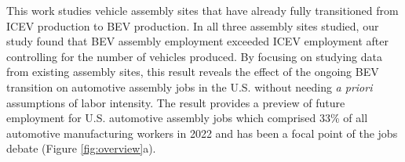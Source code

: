 \documentclass[sn-mathphys,Numbered]{sn-jnl}%
\begin{document}
This work studies vehicle assembly sites that have already fully transitioned from ICEV production to BEV production. In all three assembly sites studied, our study found that BEV assembly employment exceeded ICEV employment after controlling for the number of vehicles produced. By focusing on studying data from existing assembly sites, this result reveals the effect of the ongoing BEV transition on automotive assembly jobs in the U.S. without needing \textit{a priori} assumptions of labor intensity. The result provides a preview of future employment for U.S. automotive assembly jobs which comprised 33\% of all automotive manufacturing workers in 2022 and has been a focal point of the jobs debate \cite{Ford_Motor_Company2017-ps} (Figure \ref{fig:overview}a). 

\end{document}
